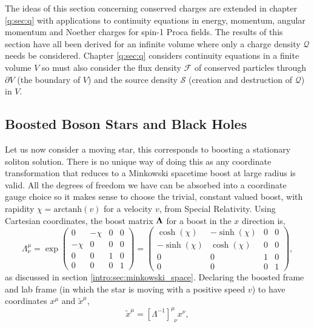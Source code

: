 The ideas of this section concerning conserved charges are extended in chapter \ref{q:sec:q} with applications to continuity equations in energy, momentum, angular momentum and Noether charges for spin-1 Proca fields. The results of this section have all been derived for an infinite volume where only a charge density $\mathcal{Q}$ needs be considered. Chapter \ref{q:sec:q} considers continuity equations in a finite volume $V$ so must also consider the flux density $\mathcal{F}$ of conserved particles through $\partial V$ (the boundary of $V$) and the source density $\mathcal{S}$ (creation and destruction of $\mathcal{Q}$) in $V$.

\subsection{Boosted Boson Stars and Black Holes}\label{boson:sec:boost}
Let us now consider a moving star, this corresponds to boosting a stationary soliton solution. There is no unique way of doing this as any coordinate transformation that reduces to a Minkowski spacetime boost at large radius is valid. All the degrees of freedom we have can be absorbed into a coordinate gauge choice so it makes sense to choose the trivial, constant valued boost, with rapidity $\chi = \mathrm{arctanh} (v)$ for a velocity $v$, from Special Relativity. Using Cartesian coordinates, the boost matrix $\boldsymbol{\Lambda}$ for a boost in the $x$ direction is,
\begin{equation}
\Lambda_\nu^\mu =  \exp\begin{pmatrix} 0 & -\chi & 0& 0 \\ -\chi & 0 & 0 & 0\\ 0 & 0&1&0 \\ 0&0&0&1\end{pmatrix} = \begin{pmatrix} \cosh(\chi) & -\sinh(\chi) & 0& 0 \\ -\sinh(\chi) & \cosh(\chi) & 0 & 0\\ 0 & 0&1&0 \\ 0&0&0&1\end{pmatrix},
\end{equation}
as discussed in section \ref{intro:sec:minkowski_space}. Declaring the boosted frame and lab frame (in which the star is moving with a positive speed $v$) to have coordinates $x^\mu$ and $\tilde{x}^\mu$,
\begin{equation}
\tilde{x}^\mu = [\Lambda^{-1}]^{\mu}_{\,\,\,\nu}x^{\nu},
\end{equation}
